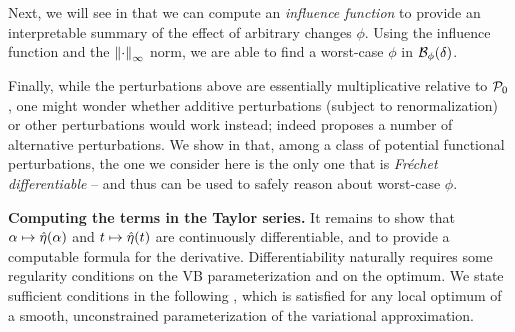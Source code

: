 Next, we will see in  that we can compute an
\emph{influence function} to provide an interpretable summary of the effect of
arbitrary changes $\phi$.  Using the influence function and the
$\left\Vert\cdot\right\Vert_{\infty}$ norm, we are able to find a worst-case $\phi$ in
$\mathcal{B}_\phi(\delta)$.

Finally, while the perturbations above are essentially multiplicative relative
to $\mathcal{P}_{0}$, one might wonder whether additive perturbations (subject to
renormalization) or other perturbations would work instead; indeed
\citet{gustafson:1996:local} proposes a number of alternative perturbations. We
show in  that, among a class of potential functional
perturbations, the one we consider here is the only one that is {\em Fr{\'e}chet
differentiable} -- and thus can be used to safely reason about worst-case
$\phi$.

\noindent \textbf{Computing the terms in the Taylor series.}  It remains to show
that $\alpha \mapsto \hat\eta(\alpha)$ and $t \mapsto \hat\eta(t)$ are
continuously differentiable, and to provide a computable formula for the
derivative.
%
Differentiability naturally requires some regularity conditions on the VB
parameterization and on the optimum.  We state sufficient conditions in the
following , which is satisfied for any local optimum of a
smooth, unconstrained parameterization of the variational approximation.

